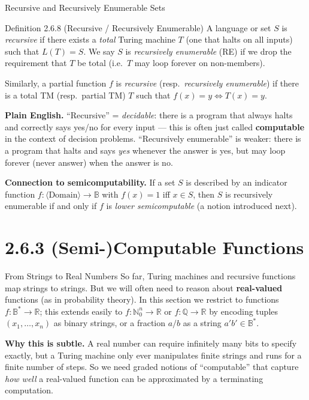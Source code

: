 \documentclass[aspectratio=169,10pt]{beamer}
\newcommand{\B}{\mathbb{B}}
\newcommand{\N}{\mathbb{N}}
\newcommand{\R}{\mathbb{R}}
\newcommand{\Q}{\mathbb{Q}}
\begin{document}
\begin{frame}{Recursive and Recursively Enumerable Sets}
  \begin{block}{Definition 2.6.8 (Recursive / Recursively Enumerable)}
    A language or set $S$ is \emph{recursive} if there exists a
    \emph{total} Turing machine $T$ (one that halts on all inputs) such that
    $L(T) = S$. We say $S$ is \emph{recursively enumerable} (RE) if we drop the
    requirement that $T$ be total (i.e.\ $T$ may loop forever on non-members).

    Similarly, a partial function $f$ is \emph{recursive} (resp.\
    \emph{recursively enumerable}) if there is a total TM (resp.\ partial TM)
    $T$ such that $f(x) = y \iff T(x) = y$.
  \end{block}
  \textbf{Plain English.} ``Recursive'' = \emph{decidable}: there is a program
  that always halts and correctly says yes/no for every input --- this is
  often just called \textbf{computable} in the context of decision problems.
  ``Recursively enumerable'' is weaker: there is a program that halts and says
  \emph{yes} whenever the answer is yes, but may loop forever (never answer)
  when the answer is no.

  \vspace{2mm}
  \textbf{Connection to semicomputability.} If a set $S$ is described by an
  indicator function $f : \langle \text{Domain} \rangle \to \B$ with
  $f(x) = 1$ iff $x \in S$, then $S$ is recursively enumerable if and only if
  $f$ is \emph{lower semicomputable} (a notion introduced next).
\end{frame}

\section{2.6.3 (Semi-)Computable Functions}

\begin{frame}{From Strings to Real Numbers}
  So far, Turing machines and recursive functions map strings to strings. But
  we will often need to reason about \textbf{real-valued} functions (as in
  probability theory). In this section we restrict to functions
  $f : \B^{*} \to \R$; this extends easily to $f : \N_0^{n} \to \R$ or
  $f : \Q \to \R$ by encoding tuples $(x_1,\dots,x_n)$ as binary strings, or a
  fraction $a/b$ as a string $a'b' \in \B^{*}$.

  \textbf{Why this is subtle.} A real number can require infinitely many bits
  to specify exactly, but a Turing machine only ever manipulates finite
  strings and runs for a finite number of steps. So we need graded notions of
  ``computable'' that capture \emph{how well} a real-valued function can be
  approximated by a terminating computation.
\end{frame}
\end{document}
